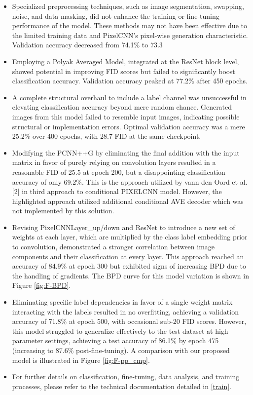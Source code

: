 \documentclass{article}
\begin{document}
\begin{itemize}
    \item Specialized preprocessing techniques, such as image segmentation, swapping, noise, and data masking, did not enhance the training or fine-tuning performance of the model. These methods may not have been effective due to the limited training data and PixelCNN's pixel-wise generation characteristic. Validation accuracy decreased from 74.1\% to 73.3%
    \item Employing a Polyak Averaged Model, integrated at the ResNet block level, showed potential in improving FID scores but failed to significantly boost classification accuracy. Validation accuracy peaked at 77.2\% after 450 epochs.
    \item A complete structural overhaul to include a label channel was unsuccessful in elevating classification accuracy beyond mere random chance. Generated images from this model failed to resemble input images, indicating possible structural or implementation errors. Optimal validation accuracy was a mere 25.2\% over 400 epochs, with 28.7 FID at the same checkpoint.
    \item Modifying the PCNN++G by eliminating the final addition with the input matrix in favor of purely relying on convolution layers resulted in a reasonable FID of 25.5 at epoch 200, but a disappointing classification accuracy of only 69.2\%. This is the approach utilized by vann den Oord et al. [2] in third approach to conditional PIXELCNN model. However, the highlighted approach utilized additional conditional AVE decoder which was not implemented by this solution.
    \item Revising PixelCNNLayer\_up/down and ResNet to introduce a new set of weights at each layer, which are multiplied by the class label embedding prior to convolution, demonstrated a stronger correlation between image components and their classification at every layer. This approach reached an accuracy of 84.9\% at epoch 300 but exhibited signs of increasing BPD due to the handling of gradients. The BPD curve for this model variation is shown in Figure \ref{fig:F-BPD}.
    \item Eliminating specific label dependencies in favor of a single weight matrix interacting with the labels resulted in no overfitting, achieving a validation accuracy of 71.8\% at epoch 500, with occasional sub-20 FID scores. However, this model struggled to generalize effectively to the test dataset at high parameter settings, achieving a test accuracy of 86.1\% by epoch 475 (increasing to 87.6\% post-fine-tuning). A comparison with our proposed model is illustrated in Figure \ref{fig:F-pp_cmp}.
    \item For further details on classification, fine-tuning, data analysis, and training processes, please refer to the technical documentation detailed in \ref{train}.
\end{itemize}
\end{document}
